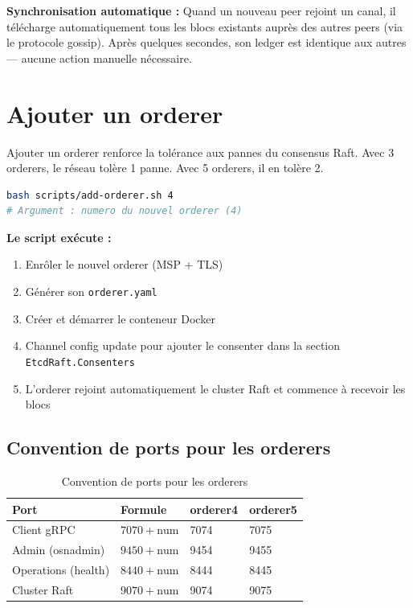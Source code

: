 \documentclass[12pt,a4paper,twoside]{report}
\begin{document}
\begin{tipbox}
\textbf{Synchronisation automatique :} Quand un nouveau peer rejoint un canal, il télécharge automatiquement tous les blocs existants auprès des autres peers (via le protocole gossip). Après quelques secondes, son ledger est identique aux autres --- aucune action manuelle nécessaire.
\end{tipbox}

\section{Ajouter un orderer}

Ajouter un orderer renforce la tolérance aux pannes du consensus Raft. Avec 3 orderers, le réseau tolère 1 panne. Avec 5 orderers, il en tolère 2.

\begin{lstlisting}[language=bash, caption=Ajouter orderer4 au cluster Raft]
bash scripts/add-orderer.sh 4
# Argument : numero du nouvel orderer (4)
\end{lstlisting}

\textbf{Le script exécute :}
\begin{enumerate}
    \item Enrôler le nouvel orderer (MSP + TLS)
    \item Générer son \texttt{orderer.yaml}
    \item Créer et démarrer le conteneur Docker
    \item Channel config update pour ajouter le consenter dans la section \texttt{EtcdRaft.Consenters}
    \item L'orderer rejoint automatiquement le cluster Raft et commence à recevoir les blocs
\end{enumerate}

\subsection{Convention de ports pour les orderers}

\begin{table}[H]
\centering
\begin{tabularx}{\textwidth}{lXll}
\toprule
\textbf{Port} & \textbf{Formule} & \textbf{orderer4} & \textbf{orderer5} \\
\midrule
Client gRPC & $7070 + \text{num}$ & 7074 & 7075 \\
Admin (osnadmin) & $9450 + \text{num}$ & 9454 & 9455 \\
Operations (health) & $8440 + \text{num}$ & 8444 & 8445 \\
Cluster Raft & $9070 + \text{num}$ & 9074 & 9075 \\
\bottomrule
\end{tabularx}
\caption{Convention de ports pour les orderers}
\end{table}
\end{document}
